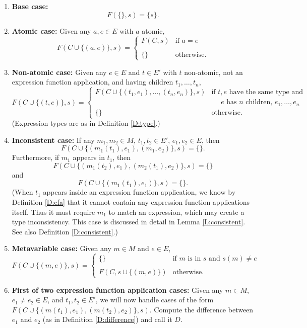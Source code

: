 \documentclass{article}
\begin{document}
\begin{enumerate}
\item	\label{case:base}
		{\bf Base case:}
		$$
        	F(\{\},s) = \{s\}.
        $$
\item	\label{case:atomic}
		{\bf Atomic case:}
		Given any $a,e\in E$ with $a$ atomic,
		$$
        	F(C\cup\{(a,e)\},s) = \left\{
            	\begin{array}{ll}
                	F(C,s) & \text{if $a=e$} \\
					& \\
                    \{\} & \text{otherwise.}
                \end{array}
            \right.
        $$
\item	\label{case:children}
		{\bf Non-atomic case:}
		Given any $e\in E$ and $t\in E'$ with $t$ non-atomic, not an expression function application, and having children $t_1,\ldots,t_n$,
		$$
        	F(C\cup\{(t,e)\},s) = \left\{
            	\begin{array}{ll}
                	F(C\cup\{(t_1,e_1),\ldots,(t_n,e_n)\},s)
                    	& \text{if $t,e$ have the same type and} \\
                        & \text{~ ~ $e$ has $n$ children, $e_1,\ldots,e_n$} \\
                    \{\} & \text{otherwise.}
                \end{array}
            \right.
        $$
        (Expression types are as in Definition \ref{D:type}.)
\item	\label{case:inconsistent}
		{\bf Inconsistent case:}
		If any $m_1,m_2\in M$, $t_1,t_2\in E'$, $e_1,e_2\in E$, then
		$$	F(C\cup\{(m_1(t_1),e_1),(m_1,e_2)\},s)=\{\}.	$$
		Furthermore, if $m_1$ appears in $t_1$, then
		$$	F(C\cup\{(m_1(t_2),e_1),(m_2(t_1),e_2)\},s)=\{\}	$$
		and
		$$	F(C\cup\{(m_1(t_1),e_1)\},s)=\{\}.	$$
		(When $t_1$ appears inside an expression function application, we know by Definition \ref{D:efa} that it cannot contain any expression function applications itself.  Thus it must require $m_1$ to match an expression, which may create a type inconsistency.  This case is discussed in detail in Lemma \ref{L:consistent}.  See also Definition \ref{D:consistent}.)
\item	\label{case:metavar}
		{\bf Metavariable case:}
		Given any $m\in M$ and $e\in E$,
		$$
        	F(C\cup\{(m,e)\},s) = \left\{
            	\begin{array}{ll}
                    \{\} & \text{if $m$ is in $s$ and $s(m)\neq e$} \\
                    & \\
                    F(C,s\cup\{(m,e)\}) & \text{otherwise.}
                \end{array}
            \right.
        $$
\item	\label{case:lambda1}
		{\bf First of two expression function application cases:}
		Given any $m\in M$, $e_1\neq e_2\in E$, and $t_1,t_2\in E'$, we will now handle cases of the form $F(C\cup\{(m(t_1),e_1),(m(t_2),e_2)\},s)$.  Compute the difference between $e_1$ and $e_2$ (as in Definition \ref{D:difference}) and call it $D$.
		

\end{enumerate}
\end{document}
